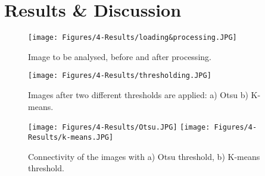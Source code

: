 \section{Results \& Discussion}

\begin{figure}[h] %
    \centering
    \texttt{[image: Figures/4-Results/loading\&processing.JPG]}
    \caption{Image to be analysed, before and after processing.}
    \label{fig:limitationrhcf}
\end{figure}


\begin{figure}[h] %
    \centering
    \texttt{[image: Figures/4-Results/thresholding.JPG]}
    \caption{Images after two different thresholds are applied: a) Otsu b) K-means.}
    \label{fig:limitationrhcf}
\end{figure}


\begin{figure}[h] %
    \centering
    \texttt{[image: Figures/4-Results/Otsu.JPG]}
    \texttt{[image: Figures/4-Results/k-means.JPG]}
    \caption{Connectivity of the images with a) Otsu threshold, b) K-means threshold.}
    \label{fig:limitationrhcf}
\end{figure}

